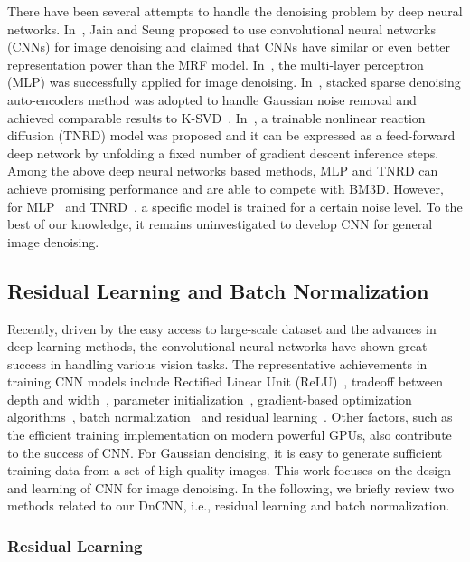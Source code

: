 \documentclass[journal]{IEEEtran}
\begin{document}
There have been several attempts to handle the denoising problem by deep neural networks. In~\cite{jain2009natural},  Jain and Seung proposed to use convolutional neural networks (CNNs) for image denoising and claimed that CNNs have similar or even better representation power than the MRF model.
In~\cite{burger2012image}, the multi-layer perceptron (MLP) was successfully applied for image denoising.
In~\cite{xie2012image}, stacked sparse denoising auto-encoders method was adopted to handle Gaussian noise removal and achieved comparable results to K-SVD~\cite{elad2006image}.
In~\cite{chen2015trainable}, a trainable nonlinear reaction diffusion (TNRD) model was proposed and it can be expressed as a feed-forward deep network by unfolding a fixed number of gradient descent inference steps.
Among the above deep neural networks based methods, MLP and TNRD can achieve promising performance and are able to compete with BM3D. However, for MLP~\cite{burger2012image} and TNRD~\cite{chen2015trainable}, a specific model is trained for
a certain noise level. To the best of our knowledge, it remains uninvestigated to develop CNN for general image denoising.



\subsection{Residual Learning and Batch Normalization}

Recently, driven by the easy access to large-scale dataset and the advances in deep learning methods, the convolutional neural networks have shown great success in handling various vision tasks. The representative achievements in training CNN models include Rectified Linear Unit (ReLU)~\cite{krizhevsky2012imagenet}, tradeoff between depth and width~\cite{simonyan2014very,szegedy2015googlenet}, parameter initialization~\cite{he2015delving}, gradient-based optimization algorithms~\cite{duchi2011adaptive,zeiler2012adadelta,kingma2014adam}, batch normalization~\cite{ioffe2015batch} and residual learning~\cite{he2015deep}. Other factors, such as the efficient training implementation on modern powerful GPUs, also contribute to the success of CNN. For Gaussian denoising, it is easy to generate sufficient training data from a set of high quality images. This work focuses on the design and learning of CNN for image denoising. In the following, we briefly review two methods related to our DnCNN, i.e., residual learning and batch normalization.


\subsubsection{Residual Learning}
\end{document}
